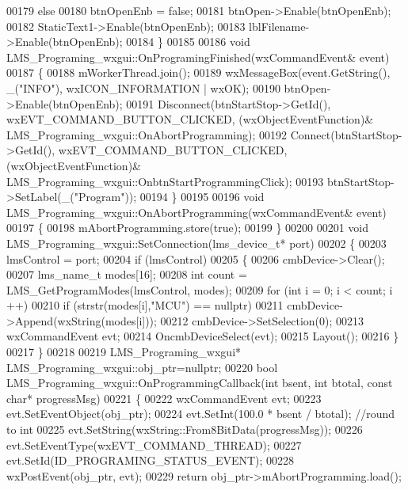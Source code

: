 \begin{DoxyCode}
00179     \textcolor{keywordflow}{else}
00180         btnOpenEnb = \textcolor{keyword}{false};
00181     btnOpen->Enable(btnOpenEnb);
00182     StaticText1->Enable(btnOpenEnb);
00183     lblFilename->Enable(btnOpenEnb);
00184 \}
00185 
00186 \textcolor{keywordtype}{void} LMS_Programing_wxgui::OnProgramingFinished(wxCommandEvent& event)
00187 \{
00188     mWorkerThread.join();
00189     wxMessageBox(event.GetString(), \_(\textcolor{stringliteral}{"INFO"}), wxICON\_INFORMATION | wxOK);
00190     btnOpen->Enable(btnOpenEnb);
00191     Disconnect(btnStartStop->GetId(), wxEVT\_COMMAND\_BUTTON\_CLICKED, (wxObjectEventFunction)&
      LMS_Programing_wxgui::OnAbortProgramming);
00192     Connect(btnStartStop->GetId(), wxEVT\_COMMAND\_BUTTON\_CLICKED, (wxObjectEventFunction)&
      LMS_Programing_wxgui::OnbtnStartProgrammingClick);
00193     btnStartStop->SetLabel(\_(\textcolor{stringliteral}{"Program"}));
00194 \}
00195 
00196 \textcolor{keywordtype}{void} LMS_Programing_wxgui::OnAbortProgramming(wxCommandEvent& event)
00197 \{
00198     mAbortProgramming.store(\textcolor{keyword}{true});
00199 \}
00200 
00201 \textcolor{keywordtype}{void} LMS_Programing_wxgui::SetConnection(lms_device_t* port)
00202 \{
00203     lmsControl = port;
00204     \textcolor{keywordflow}{if} (lmsControl)
00205     \{
00206         cmbDevice->Clear();
00207         lms_name_t modes[16];
00208         \textcolor{keywordtype}{int} count = LMS_GetProgramModes(lmsControl, modes);
00209         \textcolor{keywordflow}{for} (\textcolor{keywordtype}{int} i = 0; i < count; i ++)
00210             \textcolor{keywordflow}{if} (strstr(modes[i],\textcolor{stringliteral}{"MCU"}) == \textcolor{keyword}{nullptr})
00211                 cmbDevice->Append(wxString(modes[i]));
00212         cmbDevice->SetSelection(0);
00213         wxCommandEvent evt;
00214         OncmbDeviceSelect(evt);
00215         Layout();
00216     \}
00217 \}
00218 
00219 LMS_Programing_wxgui* LMS_Programing_wxgui::obj_ptr=\textcolor{keyword}{nullptr};
00220 \textcolor{keywordtype}{bool} LMS_Programing_wxgui::OnProgrammingCallback(\textcolor{keywordtype}{int} bsent, \textcolor{keywordtype}{int} btotal, \textcolor{keyword}{const} \textcolor{keywordtype}{char}* progressMsg)
00221 \{
00222     wxCommandEvent evt;
00223     evt.SetEventObject(obj_ptr);
00224     evt.SetInt(100.0 * bsent / btotal); \textcolor{comment}{//round to int}
00225     evt.SetString(wxString::From8BitData(progressMsg));
00226     evt.SetEventType(wxEVT\_COMMAND\_THREAD);
00227     evt.SetId(ID_PROGRAMING_STATUS_EVENT);
00228     wxPostEvent(obj_ptr, evt);
00229     \textcolor{keywordflow}{return} obj_ptr->mAbortProgramming.load();

\end{DoxyCode}
